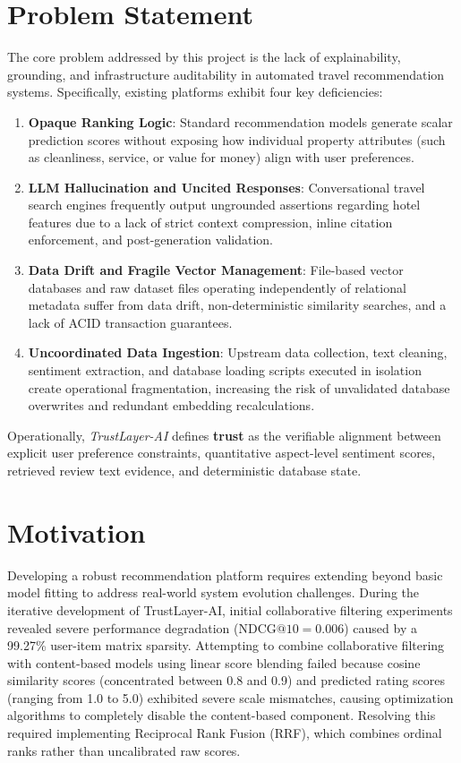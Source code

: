 \section{Problem Statement}
The core problem addressed by this project is the lack of explainability, grounding, and infrastructure auditability in automated travel recommendation systems. Specifically, existing platforms exhibit four key deficiencies:
\begin{enumerate}
    \item \textbf{Opaque Ranking Logic}: Standard recommendation models generate scalar prediction scores without exposing how individual property attributes (such as cleanliness, service, or value for money) align with user preferences.
    \item \textbf{LLM Hallucination and Uncited Responses}: Conversational travel search engines frequently output ungrounded assertions regarding hotel features due to a lack of strict context compression, inline citation enforcement, and post-generation validation.
    \item \textbf{Data Drift and Fragile Vector Management}: File-based vector databases and raw dataset files operating independently of relational metadata suffer from data drift, non-deterministic similarity searches, and a lack of ACID transaction guarantees.
    \item \textbf{Uncoordinated Data Ingestion}: Upstream data collection, text cleaning, sentiment extraction, and database loading scripts executed in isolation create operational fragmentation, increasing the risk of unvalidated database overwrites and redundant embedding recalculations.
\end{enumerate}

Operationally, \textit{TrustLayer-AI} defines \textbf{trust} as the verifiable alignment between explicit user preference constraints, quantitative aspect-level sentiment scores, retrieved review text evidence, and deterministic database state.

\section{Motivation}
Developing a robust recommendation platform requires extending beyond basic model fitting to address real-world system evolution challenges. During the iterative development of TrustLayer-AI, initial collaborative filtering experiments revealed severe performance degradation ($\text{NDCG}@10 = 0.006$) caused by a 99.27\% user-item matrix sparsity. Attempting to combine collaborative filtering with content-based models using linear score blending failed because cosine similarity scores (concentrated between 0.8 and 0.9) and predicted rating scores (ranging from 1.0 to 5.0) exhibited severe scale mismatches, causing optimization algorithms to completely disable the content-based component. Resolving this required implementing Reciprocal Rank Fusion (RRF), which combines ordinal ranks rather than uncalibrated raw scores.

